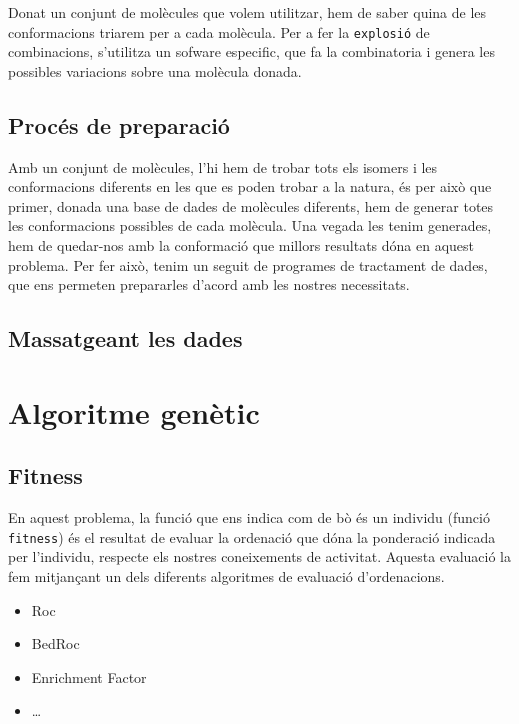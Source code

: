 \documentclass[titlepage,a4paper,12pt]{book}
\begin{document}
Donat un conjunt de molècules que volem utilitzar, hem de saber quina de les conformacions triarem
per a cada molècula.  Per a fer la \texttt{explosió} de combinacions, s'utilitza un sofware
especific, que fa la combinatoria i genera les possibles variacions sobre una molècula donada. 

\subsection{Procés de preparació} %
\label{sub:Proces de preparacio}

Amb un conjunt de molècules, l'hi hem de trobar tots els isomers i les conformacions diferents en
les que es poden trobar a la natura, és per això que primer, donada una base de dades de molècules
diferents, hem de generar totes les conformacions possibles de cada molècula.  Una vegada les tenim
generades, hem de quedar-nos amb la conformació que millors resultats dóna en aquest problema.  Per
fer això, tenim un seguit de programes de tractament de dades, que ens permeten prepararles d'acord
amb les nostres necessitats.

\subsection{Massatgeant les dades} %
\label{sub:Massatgeant les dades}



\section{Algoritme genètic} %
\label{sec:Algoritme genetic}

\subsection{Fitness} %
\label{sub:Fitness}
En aquest problema, la funció que ens indica com de bò és un individu (funció \texttt{fitness}) és
el resultat de evaluar la ordenació que dóna la ponderació indicada per l'individu, respecte els
nostres coneixements de activitat. Aquesta evaluació la fem mitjançant un dels diferents algoritmes
de evaluació d'ordenacions.

\begin{itemize}
	\item Roc
	\item BedRoc
	\item Enrichment Factor
	\item \dots
\end{itemize}
\end{document}
